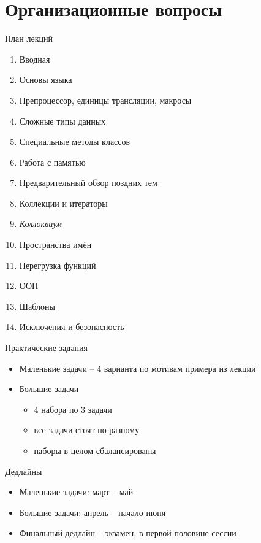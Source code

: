 \documentclass[unknownkeysallowed,xcolor=table]{beamer}
\begin{document}
\section{Организационные вопросы}

\begin{frame}{План лекций}
  \scriptsize
  \begin{enumerate}
    \item Вводная
    \item Основы языка
    \item Препроцессор, единицы трансляции, макросы
    \item Сложные типы данных
    \item Специальные методы классов
    \item Работа с памятью
    \item Предварительный обзор поздних тем
    \item Коллекции и итераторы
    \item \emph{Коллоквиум}
    \item Пространства имён
    \item Перегрузка функций
    \item ООП
    \item Шаблоны
    \item Исключения и безопасность
  \end{enumerate}
\end{frame}

\begin{frame}{Практические задания}
  \begin{itemize}
    \item Маленькие задачи -- 4 варианта по мотивам примера из лекции \vspace{2em}
    \item Большие задачи
      \begin{itemize}
        \item 4 набора по 3 задачи \vspace{0.5em}
        \item все задачи стоят по-разному \vspace{0.5em}
        \item наборы в целом сбалансированы
      \end{itemize}
  \end{itemize}
\end{frame}

\begin{frame}{Дедлайны}
  \begin{itemize}
    \item Маленькие задачи: март -- май \vspace{2em}
    \item Большие задачи: апрель -- начало июня \vspace{2em}
    \item Финальный дедлайн -- экзамен, в первой половине сессии
  \end{itemize}
\end{frame}
\end{document}

